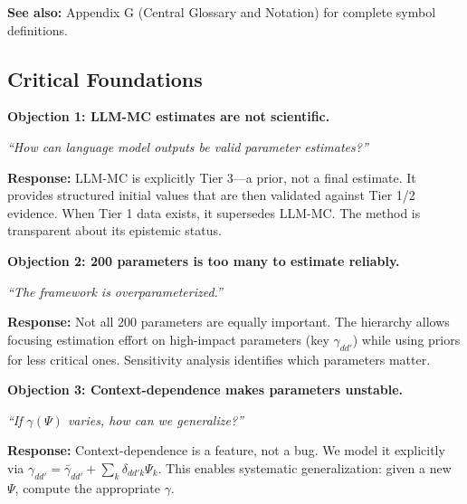 \textbf{See also:} Appendix G (Central Glossary and Notation) for complete symbol definitions.


\subsection{Critical Foundations}
\label{sec:BBB-foundations}

\begin{tcolorbox}[colback=red!5!white, colframe=red!75!black,
    title=\textbf{Critical Foundations: Objections and Responses}]

\textbf{Objection 1: LLM-MC estimates are not scientific.}

\textit{``How can language model outputs be valid parameter estimates?''}

\textbf{Response:} LLM-MC is explicitly Tier 3---a prior, not a final estimate. It provides
structured initial values that are then validated against Tier 1/2 evidence. When Tier 1
data exists, it supersedes LLM-MC. The method is transparent about its epistemic status.

\medskip

\textbf{Objection 2: 200 parameters is too many to estimate reliably.}

\textit{``The framework is overparameterized.''}

\textbf{Response:} Not all 200 parameters are equally important. The hierarchy allows
focusing estimation effort on high-impact parameters (key $\gamma_{dd'}$) while using
priors for less critical ones. Sensitivity analysis identifies which parameters matter.

\medskip

\textbf{Objection 3: Context-dependence makes parameters unstable.}

\textit{``If $\gamma(\Psi)$ varies, how can we generalize?''}

\textbf{Response:} Context-dependence is a feature, not a bug. We model it explicitly
via $\gamma_{dd'} = \bar{\gamma}_{dd'} + \sum_k \delta_{dd'k} \Psi_k$. This enables
systematic generalization: given a new $\Psi$, compute the appropriate $\gamma$.

\end{tcolorbox}


